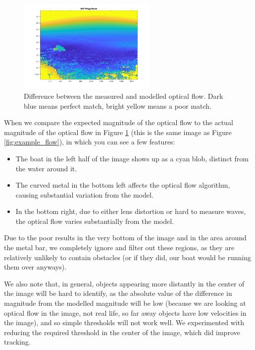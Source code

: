 \documentclass{article}
\begin{document}
\begin{figure}
\centering
\includegraphics[width=0.6\textwidth]{diff_magnitude}
\caption{Difference between the measured and modelled optical flow.
         Dark blue means perfect match, bright yellow means a poor match.}
\label{fig:diff_magnitude}
\end{figure}

When we compare the expected magnitude of the optical flow to the
actual magnitude of the optical flow in Figure \ref{fig:diff_magnitude}
(this is the same image as Figure \ref{fig:example_flow}),
in which you can see a few features:
\begin{itemize}
\item The boat in the left half of the image shows up as a cyan blob, distinct
      from the water around it.
\item The curved metal in the bottom left affects the optical flow
      algorithm, causing substantial variation from the model.
\item In the bottom right, due to either lens distortion or hard to measure
      waves, the optical flow varies substantially from the model.
\end{itemize}

Due to the poor results in the very bottom of the image and in the
area around the metal bar, we completely ignore and filter out these regions,
as they are relatively unlikely to contain obstacles (or if they did, our
boat would be running them over anyways).

We also note that, in general, objects appearing more distantly in the center of
the image will be hard to identify, as the absolute value of the difference
in magnitude from the modelled magnitude will be low (because we are looking
at optical flow in the image, not real life, so far away objects have
low velocities in the image), and so simple thresholds will not work well.
We experimented with reducing the required threshold in the center of the image,
which did improve tracking.
\end{document}
